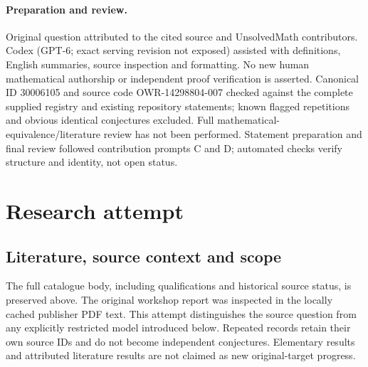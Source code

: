 \documentclass[11pt]{article}
\begin{document}
\paragraph{Preparation and review.}
Original question attributed to the cited source and UnsolvedMath contributors. Codex (GPT-6; exact serving revision not exposed) assisted with definitions, English summaries, source inspection and formatting. No new human mathematical authorship or independent proof verification is asserted. Canonical ID 30006105 and source code OWR-14298804-007 checked against the complete supplied registry and existing repository statements; known flagged repetitions and obvious identical conjectures excluded. Full mathematical-equivalence/literature review has not been performed. Statement preparation and final review followed contribution prompts C and D; automated checks verify structure and identity, not open status.
\label{end:30006105}

\section{Research attempt}
\subsection{Literature, source context and scope}
The full catalogue body, including qualifications and historical source status, is preserved above. The original workshop report was inspected in the locally cached publisher PDF text. This attempt distinguishes the source question from any explicitly restricted model introduced below. Repeated records retain their own source IDs and do not become independent conjectures. Elementary results and attributed literature results are not claimed as new original-target progress.
\end{document}
